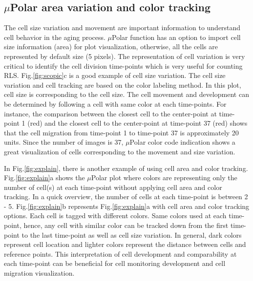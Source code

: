 \documentclass[conference]{IEEEtran}
\begin{document}
\subsection{$\mu$Polar area variation and color tracking }
The cell size variation and movement are important information to understand cell behavior in the aging process. $\mu$Polar function has an option to import cell size information (area) for plot visualization, otherwise, all the cells are represented by default size (5 pixels). The representation of cell variation is very critical to identify the cell division time-points which is very useful for counting RLS. Fig.\ref{fig:scopic}c is a good example of cell size variation. The cell size variation and cell tracking are based on the color labeling method. In this plot, cell size is corresponding to the  cell size. The cell movement and development can be determined by following a cell with same color at each time-points. For instance, the comparison between the closest cell to the center-point at time-point 1 (red) and the closest cell to the center-point at time-point 37 (red) shows that the cell migration from time-point 1 to time-point 37 is approximately 20 units. Since the number of images is 37, $\mu$Polar color code indication shows a great visualization of cells corresponding to the movement and size variation. 

In Fig.\ref{fig:explain}, there is another example of using cell area and color tracking.
Fig.\ref{fig:explain}a shows the $\mu$Polar plot where colors are representing only the number of cell(s) at each time-point without applying cell area and color tracking. In a quick overview, the number of cells at each time-point is between 2 - 5. Fig.\ref{fig:explain}b represents Fig.\ref{fig:explain}a with cell area and color tracking options. Each cell is tagged with different colors. Same colors used at each time-point, hence, any cell with similar color can be tracked down from the first time-point to the last time-point as well as cell size variation. In general, dark colors represent cell location and lighter colors represent the distance between cells and reference points. This interpretation of cell development and comparability at each time-point can be beneficial for cell monitoring development and cell migration visualization.
\end{document}
